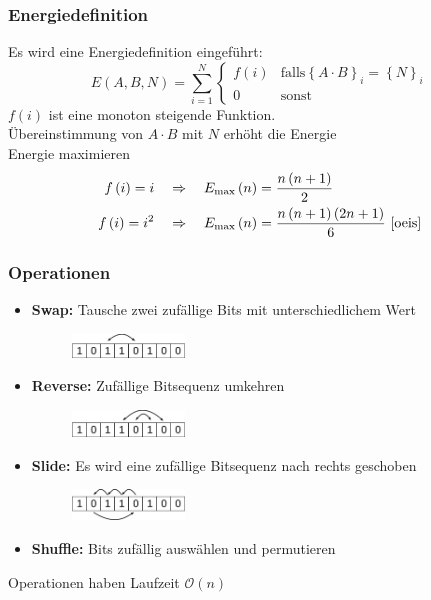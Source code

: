 \begin{frame}
  \frametitle{Energiedefinition}
  Es wird eine Energiedefinition eingeführt:
  \begin{equation*}
    E\left(A,B,N\right)=\sum\limits_{i=1}^N\begin{cases}f\left(i\right) & \mathrm{falls} {\left\{A\cdot B\right\}}_i={\left\{N\right\}}_i \\ 0 & \mathrm{sonst}\end{cases}
  \end{equation*}
  \pause{}
  $f\left(i\right)$ ist eine monoton steigende Funktion. \\
  \Rightarrow{} Übereinstimmung von $A\cdot B$ mit $N$ erhöht die Energie \\
  \Rightarrow{} Energie maximieren
  \pause{}
  \begin{align*}
    f\left(i\right)=i \quad&\Rightarrow\quad E_\mathrm{\max}\left(n\right)=\frac{n\left(n+1\right)}{2} \\
    f\left(i\right)=i^2 \quad&\Rightarrow\quad E_\mathrm{\max}\left(n\right)=\frac{n\left(n+1\right)\left(2n+1\right)}{6}\text{~\cite{oeis}}
  \end{align*}
\end{frame}

\begin{frame}
  \frametitle{Operationen}
  \begin{itemize}
    \setlength{\itemsep}{5pt}
    \item\textbf{Swap:} Tausche zwei zufällige Bits mit unterschiedlichem Wert
      \begin{figure}[H]
        \centering
        \includegraphics[width=3cm]{fig/bits-swap.png}
      \end{figure}
      \pause{}
    \item\textbf{Reverse:} Zufällige Bitsequenz umkehren
      \begin{figure}[H]
        \centering
        \includegraphics[width=3cm]{fig/bits-reverse.png}
      \end{figure}
      \pause{}
    \item\textbf{Slide:} Es wird eine zufällige Bitsequenz nach rechts geschoben
      \begin{figure}[H]
        \centering
        \includegraphics[width=3cm]{fig/bits-slide.png}
      \end{figure}
      \pause{}
    \item\textbf{Shuffle:} Bits zufällig auswählen und permutieren
  \end{itemize}
  Operationen haben Laufzeit $\mathcal{O}\left(n\right)$
\end{frame}


